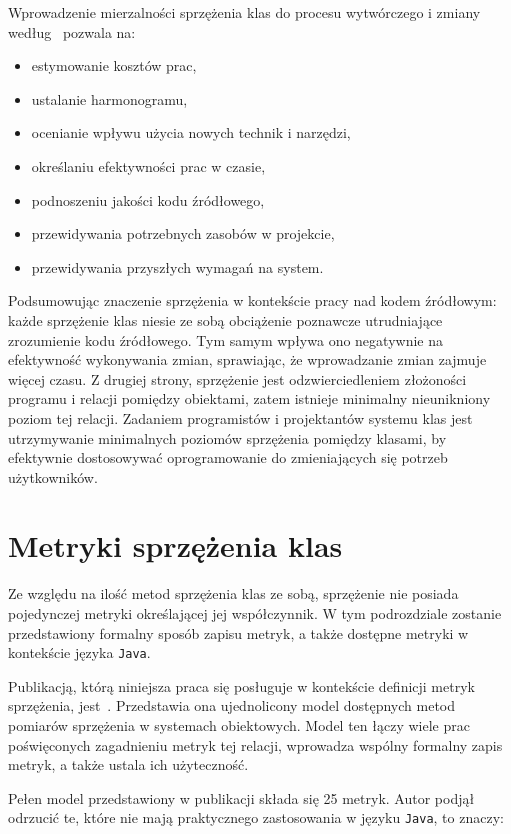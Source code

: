 Wprowadzenie mierzalności sprzężenia klas do procesu wytwórczego i zmiany według~\cite{295895} pozwala na:

\begin{itemize}
    \item estymowanie kosztów prac,
    \item ustalanie harmonogramu,
    \item ocenianie wpływu użycia nowych technik i narzędzi,
    \item określaniu efektywności prac w czasie,
    \item podnoszeniu jakości kodu źródłowego,
    \item przewidywania potrzebnych zasobów w projekcie,
    \item przewidywania przyszłych wymagań na system.
\end{itemize}

Podsumowując znaczenie sprzężenia w kontekście pracy nad kodem źródłowym: każde sprzężenie klas niesie ze sobą
obciążenie poznawcze utrudniające zrozumienie kodu źródłowego.
Tym samym wpływa ono negatywnie na efektywność wykonywania zmian, sprawiając, że wprowadzanie zmian zajmuje więcej
czasu.
Z drugiej strony, sprzężenie jest odzwierciedleniem złożoności programu i relacji pomiędzy obiektami, zatem istnieje
minimalny nieunikniony poziom tej relacji.
Zadaniem programistów i projektantów systemu klas jest utrzymywanie minimalnych poziomów sprzężenia pomiędzy
klasami, by efektywnie dostosowywać oprogramowanie do zmieniających się potrzeb użytkowników.

\section{Metryki sprzężenia klas}
\label{subsec:metryki}

Ze względu na ilość metod sprzężenia klas ze sobą, sprzężenie nie posiada pojedynczej metryki określającej jej
współczynnik.
W tym podrozdziale zostanie przedstawiony formalny sposób zapisu metryk, a także dostępne metryki w kontekście języka
\texttt{Java}.

Publikacją, którą niniejsza praca się posługuje w kontekście definicji metryk sprzężenia, jest~\cite{briand1999unified}.
Przedstawia ona ujednolicony model dostępnych metod pomiarów sprzężenia w systemach obiektowych.
Model ten łączy wiele prac poświęconych zagadnieniu metryk tej relacji, wprowadza wspólny formalny zapis metryk, a
także ustala ich użyteczność.

Pełen model przedstawiony w publikacji składa się 25 metryk.
Autor podjął odrzucić te, które nie mają praktycznego zastosowania w języku \texttt{Java}, to znaczy:

